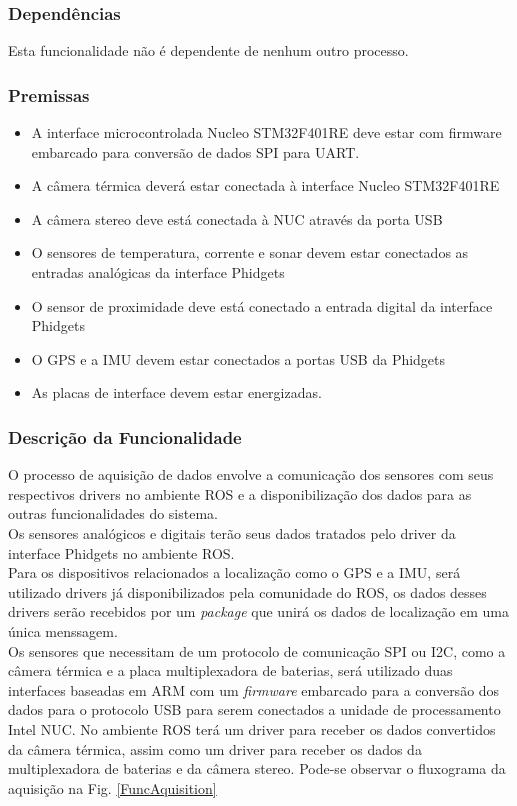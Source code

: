      \subsubsection{Dependências}
     Esta funcionalidade não é dependente de nenhum outro processo.
    
     \subsubsection{Premissas}
     	\begin{itemize}
        	\item A interface microcontrolada Nucleo STM32F401RE deve estar com firmware embarcado para conversão de dados SPI para UART.
            \item A câmera térmica deverá estar conectada à interface Nucleo STM32F401RE
            \item A câmera stereo deve está conectada à NUC através da porta USB
            \item O sensores de temperatura, corrente e sonar devem estar conectados as entradas analógicas da interface Phidgets
            \item O sensor de proximidade deve está conectado a entrada digital da interface Phidgets
            \item O GPS e a IMU devem estar conectados a portas USB da Phidgets
            \item As placas de interface devem estar energizadas.
        \end{itemize}
     
     \subsubsection{Descrição da Funcionalidade}
        	 \indent O processo de aquisição de dados envolve a comunicação dos sensores com seus respectivos drivers no ambiente ROS e a disponibilização dos dados para as outras funcionalidades do sistema.\\
     \indent Os sensores analógicos e digitais terão seus dados tratados pelo driver da interface Phidgets no ambiente ROS.\\
     \indent Para os dispositivos relacionados a localização como o GPS e a IMU, será utilizado drivers já disponibilizados pela comunidade do ROS, os dados desses drivers serão recebidos por um \textit{package} que unirá os dados de localização em uma única menssagem.\\
     \indent Os sensores que necessitam de um protocolo de comunicação SPI ou I2C, como a câmera térmica e a placa multiplexadora de baterias, será utilizado duas interfaces baseadas em ARM com um \textit{firmware} embarcado para a conversão dos dados para o protocolo USB para serem conectados a unidade de processamento Intel NUC. No ambiente ROS terá um driver para receber os dados convertidos da câmera térmica, assim como um driver para receber os dados da multiplexadora de baterias e da câmera stereo.
     Pode-se observar o fluxograma da aquisição na Fig. \ref{FuncAquisition}
     

